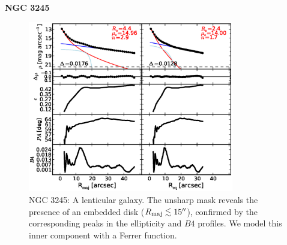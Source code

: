 \documentclass[preprint2]{emulateapj}
\newcommand{\fitfigurewidth}{0.8\textwidth}
\begin{document}
  \clearpage\newpage\noindent
  {\bf NGC 3245 \\}

  \begin{figure}[h]
  \begin{center}
  \includegraphics[width=\fitfigurewidth]{images/n3245_1Dfit.eps}
  \caption{NGC 3245:
  A lenticular galaxy.
  The unsharp mask reveals the presence of an embedded disk ($R_{\rm maj} \lesssim 15''$), 
  confirmed by the corresponding peaks in the ellipticity and $B4$ profiles.
  We model this inner component with a Ferrer function. 
  }
  \end{center}
  \end{figure}
\end{document}
